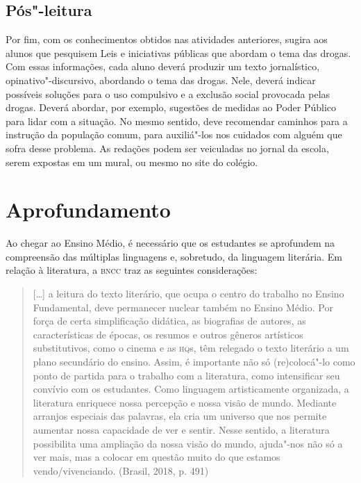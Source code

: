 \documentclass[11pt]{extarticle}
\begin{document}

\subsection{Pós"-leitura}

Por fim, com os conhecimentos obtidos nas atividades
anteriores, sugira aos alunos que pesquisem Leis e iniciativas públicas
que abordam o tema das drogas. Com essas informações, cada aluno deverá
produzir um texto jornalístico, opinativo"-discursivo, abordando o tema
das drogas. Nele, deverá indicar possíveis soluções para o uso
compulsivo e a exclusão social provocada pelas drogas. Deverá abordar,
por exemplo, sugestões de medidas ao Poder Público para lidar com a
situação. No mesmo sentido, deve recomendar caminhos para a instrução da
população comum, para auxiliá"-los nos cuidados com alguém que sofra
desse problema. As redações podem ser veiculadas no jornal da escola,
serem expostas em um mural, ou mesmo no site do colégio.

\section{Aprofundamento}

Ao chegar ao Ensino Médio, é necessário que os estudantes se aprofundem
na compreensão das múltiplas linguagens e, sobretudo, da linguagem
literária. Em relação à literatura, a \textsc{bncc} traz as seguintes
considerações:

\begin{quote}
{[}\ldots{]} a leitura do texto literário, que ocupa o centro do trabalho
no Ensino Fundamental, deve permanecer nuclear também no Ensino Médio.
Por força de certa simplificação didática, as biografias de autores, as
características de épocas, os resumos e outros gêneros artísticos
substitutivos, como o cinema e as \textsc{hq}s, têm relegado o texto literário a
um plano secundário do ensino. Assim, é importante não só (re)colocá"-lo
como ponto de partida para o trabalho com a literatura, como
intensificar seu convívio com os estudantes. Como linguagem
artisticamente organizada, a literatura enriquece nossa percepção e
nossa visão de mundo. Mediante arranjos especiais das palavras, ela cria
um universo que nos permite aumentar nossa capacidade de ver e sentir.
Nesse sentido, a literatura possibilita uma ampliação da nossa visão do
mundo, ajuda"-nos não só a ver mais, mas a colocar em questão muito do
que estamos vendo/vivenciando. (Brasil, 2018, p. 491)
\end{quote}
\end{document}
